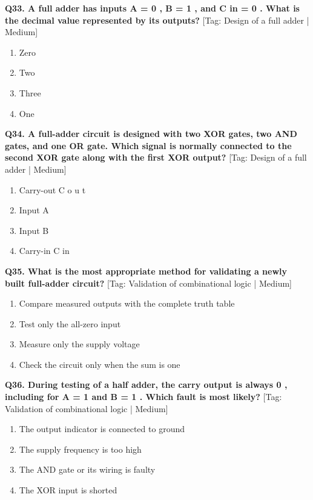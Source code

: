 \noindent\textbf{Q33. A full adder has inputs A = 0 , B = 1 , and C in = 0 . What is the decimal value represented by its outputs?} \hfill [Tag: Design of a full adder | Medium]
\begin{enumerate}[label=(\alph*),topsep=2pt,itemsep=1pt,partopsep=0pt,parsep=0pt]
    \item {Zero}
    \item {Two}
    \item {Three}
    \item {One}
\end{enumerate}
\vspace{2mm}

\noindent\textbf{Q34. A full-adder circuit is designed with two XOR gates, two AND gates, and one OR gate. Which signal is normally connected to the second XOR gate along with the first XOR output?} \hfill [Tag: Design of a full adder | Medium]
\begin{enumerate}[label=(\alph*),topsep=2pt,itemsep=1pt,partopsep=0pt,parsep=0pt]
    \item {Carry-out C o u t}
    \item {Input A}
    \item {Input B}
    \item {Carry-in C in}
\end{enumerate}
\vspace{2mm}

\noindent\textbf{Q35. What is the most appropriate method for validating a newly built full-adder circuit?} \hfill [Tag: Validation of combinational logic | Medium]
\begin{enumerate}[label=(\alph*),topsep=2pt,itemsep=1pt,partopsep=0pt,parsep=0pt]
    \item {Compare measured outputs with the complete truth table}
    \item {Test only the all-zero input}
    \item {Measure only the supply voltage}
    \item {Check the circuit only when the sum is one}
\end{enumerate}
\vspace{2mm}

\noindent\textbf{Q36. During testing of a half adder, the carry output is always 0 , including for A = 1 and B = 1 . Which fault is most likely?} \hfill [Tag: Validation of combinational logic | Medium]
\begin{enumerate}[label=(\alph*),topsep=2pt,itemsep=1pt,partopsep=0pt,parsep=0pt]
    \item {The output indicator is connected to ground}
    \item {The supply frequency is too high}
    \item {The AND gate or its wiring is faulty}
    \item {The XOR input is shorted}
\end{enumerate}
\vspace{2mm}

